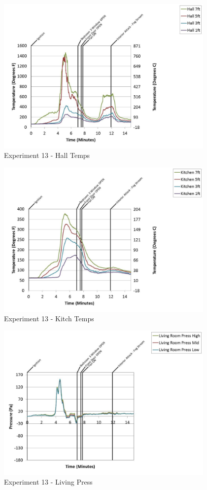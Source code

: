 \documentclass{article}
\begin{document}
\begin{appendices}
	\begin{figure}[h!]
		\centering
		\includegraphics[height=3.05in]{0_Images/Results_Charts/Exp_13_Charts/HallTemps.pdf}
		\caption{Experiment 13 - Hall Temps}
	\end{figure}
 
	\clearpage

	\begin{figure}[h!]
		\centering
		\includegraphics[height=3.05in]{0_Images/Results_Charts/Exp_13_Charts/KitchTemps.pdf}
		\caption{Experiment 13 - Kitch Temps}
	\end{figure}
 

	\begin{figure}[h!]
		\centering
		\includegraphics[height=3.05in]{0_Images/Results_Charts/Exp_13_Charts/LivingPress.pdf}
		\caption{Experiment 13 - Living Press}
	\end{figure}
 

\end{appendices}
\end{document}
